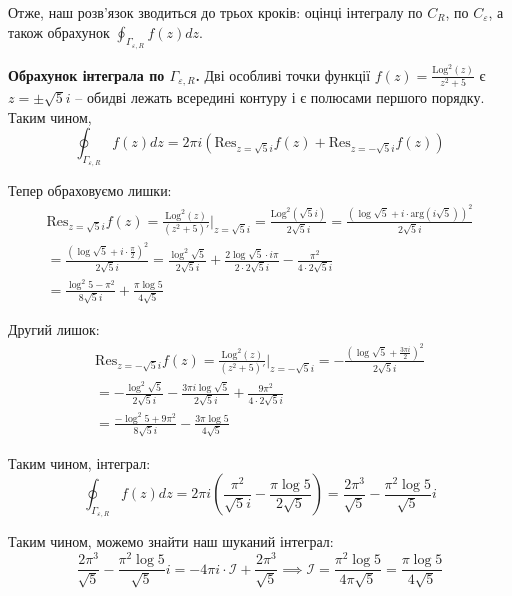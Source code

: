 \documentclass[oneside,solution]{karazin-complan-assign}
\begin{document}
Отже, наш розв'язок зводиться до трьох кроків: оцінці інтегралу по $C_R$, по $C_{\varepsilon}$, а також обрахунок $\oint_{\Gamma_{\varepsilon, R}}f(z)dz$. 

\textbf{Обрахунок інтеграла по $\Gamma_{\varepsilon, R}$.} Дві особливі точки функції $f(z) = \frac{\text{Log}^2(z)}{z^2+5}$ є $z=\pm \sqrt{5}i$ -- обидві лежать всередині контуру і є полюсами першого порядку. Таким чином,
\begin{equation}
    \oint_{\Gamma_{\varepsilon, R}} f(z)dz = 2\pi i\left(\text{Res}_{z=\sqrt{5}i}f(z) + \text{Res}_{z=-\sqrt{5}i}f(z)\right)
\end{equation}

Тепер обраховуємо лишки:
\begin{gather}
    \text{Res}_{z=\sqrt{5}i}f(z) = \frac{\text{Log}^2(z)}{(z^2+5)'}\Big|_{z=\sqrt{5}i} = \frac{\text{Log}^2(\sqrt{5}i)}{2\sqrt{5}i} = \frac{(\log \sqrt{5} + i\cdot \text{arg}(i\sqrt{5}))^2}{2\sqrt{5}i} \nonumber \\
    = \frac{(\log \sqrt{5} + i \cdot \frac{\pi}{2})^2}{2\sqrt{5}i} = \frac{\log^2 \sqrt{5}}{2\sqrt{5}i} + \frac{2\log\sqrt{5} \cdot i \pi}{2\cdot 2\sqrt{5}i} - \frac{\pi^2}{4 \cdot 2\sqrt{5}i} \nonumber \\
    = \frac{\log^2 5 - \pi^2}{8\sqrt{5}i} + \frac{\pi \log 5}{4\sqrt{5}}
\end{gather}

Другий лишок:
\begin{gather}
    \text{Res}_{z=-\sqrt{5}i}f(z) = \frac{\text{Log}^2(z)}{(z^2+5)'}\Big|_{z=-\sqrt{5}i} = -\frac{(\log \sqrt{5} + \frac{3\pi i}{2})^2}{2\sqrt{5}i} \nonumber \\
    = -\frac{\log^2 \sqrt{5}}{2\sqrt{5}i} - \frac{3\pi i \log \sqrt{5}}{2\sqrt{5}i} + \frac{9\pi^2}{4 \cdot 2\sqrt{5}i} \nonumber \\
    = \frac{-\log^2 5 + 9\pi^2}{8\sqrt{5}i} - \frac{3\pi \log 5}{4\sqrt{5}}
\end{gather}

Таким чином, інтеграл:
\begin{equation}
    \oint_{\Gamma_{\varepsilon, R}} f(z)dz = 2\pi i \left(\frac{\pi^2}{\sqrt{5}i} - \frac{\pi \log 5}{2\sqrt{5}}\right) = \frac{2\pi^3}{\sqrt{5}} - \frac{\pi^2 \log 5}{\sqrt{5}}i
\end{equation}

Таким чином, можемо знайти наш шуканий інтеграл:
\begin{equation}
    \frac{2\pi^3}{\sqrt{5}} - \frac{\pi^2\log 5}{\sqrt{5}}i = -4\pi i \cdot \mathcal{I} + \frac{2\pi^3}{\sqrt{5}} \implies \mathcal{I} = \frac{\pi^2 \log 5}{4\pi\sqrt{5}} = \boxed{\frac{\pi \log 5}{4\sqrt{5}}}
\end{equation}
\end{document}

